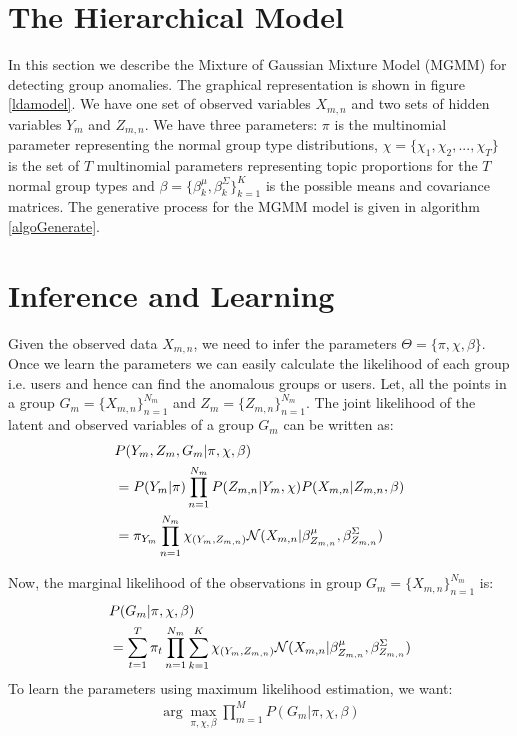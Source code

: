 \documentclass[letterpaper]{article}
\begin{document}
\section{The Hierarchical Model}\label{sec:model}

In this section we describe the Mixture of Gaussian Mixture Model (MGMM) \cite{xiong2011hierarchical} for detecting group anomalies. The graphical representation is shown in figure \ref{ldamodel}. We have one set of observed variables $X_{m,n}$ and two sets of hidden variables $Y_m$ and $Z_{m,n}$. We have three parameters: $\pi$  is the multinomial parameter representing the normal group type distributions, $\chi = \{\chi_1, \chi_2, ..., \chi_T\}$ is the set of $T$ multinomial parameters representing topic proportions for the $T$ normal group types and $\beta=\{\beta_k^\mu, \beta_k^\Sigma\}_{k=1}^K$ is the possible means and covariance matrices. The generative process for the MGMM model is given in algorithm \ref{algoGenerate}.


\section{Inference and Learning}\label{sec:inferandlearn}
Given the observed data $X_{m,n}$, we need to infer the parameters $\Theta = \{\pi,\chi,\beta\}$. Once we learn the parameters we can easily calculate the likelihood of each group i.e. users and hence can find the anomalous groups or users. Let, all the points in a group $G_m=\{X_{m,n}\}_{n=1}^{N_m}$ and $Z_m=\{Z_{m,n}\}_{n=1}^{N_m}$. The joint likelihood of the latent and observed variables of a group $G_m$ can be written as:
\begin{align}
&P(Y_m, Z_m, G_m|\pi,\chi,\beta)\notag\\
&=P(Y_m|\pi)\prod\limits_{n=1}^{N_m}P(Z_{m,n}|Y_m,\chi)P(X_{m,n}|Z_{m,n},\beta)\\
&=\pi_{Y_m}\prod\limits_{n=1}^{N_m}\chi_{(Y_m,Z_{m,n})}\mathcal{N}(X_{m,n}|\beta_{Z_{m,n}}^\mu, \beta_{Z_{m,n}}^\Sigma)
\end{align}

Now, the marginal likelihood of the observations in group $G_m=\{X_{m,n}\}_{n=1}^{N_m}$ is:
\begin{align}
&P(G_m|\pi,\chi,\beta)\notag\\
&=\sum\limits_{t=1}^T\pi_t\prod\limits_{n=1}^{N_m}\sum\limits_{k=1}^K\chi_{(Y_m,Z_{m,n})}\mathcal{N}(X_{m,n}|\beta_{Z_{m,n}}^\mu, \beta_{Z_{m,n}}^\Sigma)
\end{align}
To learn the parameters using maximum likelihood estimation, we want:
\begin{align}
\arg\max\limits_{\pi,\chi,\beta}\prod\limits_{m=1}^MP(G_m|\pi,\chi,\beta)
\end{align}
\end{document}
